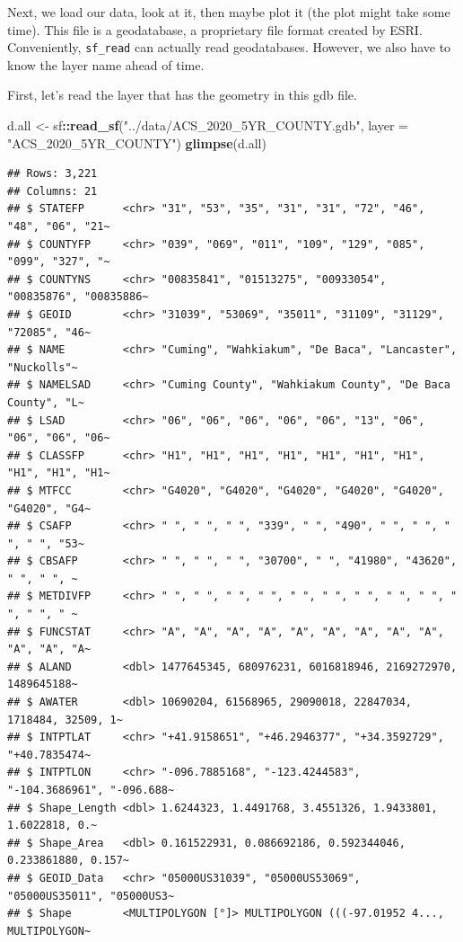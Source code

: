 \documentclass[]{article}
\newenvironment{Shaded}{\begin{snugshade}}{\end{snugshade}}
\newcommand{\AttributeTok}[1]{\textcolor[rgb]{0.13,0.29,0.53}{#1}}
\newcommand{\FunctionTok}[1]{\textcolor[rgb]{0.13,0.29,0.53}{\textbf{#1}}}
\newcommand{\NormalTok}[1]{#1}
\newcommand{\OtherTok}[1]{\textcolor[rgb]{0.56,0.35,0.01}{#1}}
\newcommand{\SpecialCharTok}[1]{\textcolor[rgb]{0.81,0.36,0.00}{\textbf{#1}}}
\newcommand{\StringTok}[1]{\textcolor[rgb]{0.31,0.60,0.02}{#1}}
\begin{document}
Next, we load our data, look at it, then maybe plot it (the plot might
take some time). This file is a geodatabase, a proprietary file format
created by ESRI. Conveniently, \texttt{sf\_read} can actually read
geodatabases. However, we also have to know the layer name ahead of
time.

First, let's read the layer that has the geometry in this gdb file.

\begin{Shaded}
\begin{Highlighting}[]
\NormalTok{d.all }\OtherTok{\textless{}{-}}\NormalTok{ sf}\SpecialCharTok{::}\FunctionTok{read\_sf}\NormalTok{(}\StringTok{"../data/ACS\_2020\_5YR\_COUNTY.gdb"}\NormalTok{, }\AttributeTok{layer =} \StringTok{"ACS\_2020\_5YR\_COUNTY"}\NormalTok{)}
\FunctionTok{glimpse}\NormalTok{(d.all)}
\end{Highlighting}
\end{Shaded}

\begin{verbatim}
## Rows: 3,221
## Columns: 21
## $ STATEFP      <chr> "31", "53", "35", "31", "31", "72", "46", "48", "06", "21~
## $ COUNTYFP     <chr> "039", "069", "011", "109", "129", "085", "099", "327", "~
## $ COUNTYNS     <chr> "00835841", "01513275", "00933054", "00835876", "00835886~
## $ GEOID        <chr> "31039", "53069", "35011", "31109", "31129", "72085", "46~
## $ NAME         <chr> "Cuming", "Wahkiakum", "De Baca", "Lancaster", "Nuckolls"~
## $ NAMELSAD     <chr> "Cuming County", "Wahkiakum County", "De Baca County", "L~
## $ LSAD         <chr> "06", "06", "06", "06", "06", "13", "06", "06", "06", "06~
## $ CLASSFP      <chr> "H1", "H1", "H1", "H1", "H1", "H1", "H1", "H1", "H1", "H1~
## $ MTFCC        <chr> "G4020", "G4020", "G4020", "G4020", "G4020", "G4020", "G4~
## $ CSAFP        <chr> " ", " ", " ", "339", " ", "490", " ", " ", " ", " ", "53~
## $ CBSAFP       <chr> " ", " ", " ", "30700", " ", "41980", "43620", " ", " ", ~
## $ METDIVFP     <chr> " ", " ", " ", " ", " ", " ", " ", " ", " ", " ", " ", " ~
## $ FUNCSTAT     <chr> "A", "A", "A", "A", "A", "A", "A", "A", "A", "A", "A", "A~
## $ ALAND        <dbl> 1477645345, 680976231, 6016818946, 2169272970, 1489645188~
## $ AWATER       <dbl> 10690204, 61568965, 29090018, 22847034, 1718484, 32509, 1~
## $ INTPTLAT     <chr> "+41.9158651", "+46.2946377", "+34.3592729", "+40.7835474~
## $ INTPTLON     <chr> "-096.7885168", "-123.4244583", "-104.3686961", "-096.688~
## $ Shape_Length <dbl> 1.6244323, 1.4491768, 3.4551326, 1.9433801, 1.6022818, 0.~
## $ Shape_Area   <dbl> 0.161522931, 0.086692186, 0.592344046, 0.233861880, 0.157~
## $ GEOID_Data   <chr> "05000US31039", "05000US53069", "05000US35011", "05000US3~
## $ Shape        <MULTIPOLYGON [°]> MULTIPOLYGON (((-97.01952 4..., MULTIPOLYGON~
\end{verbatim}
\end{document}
